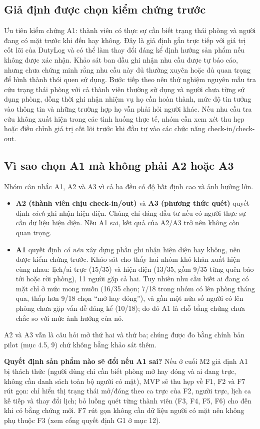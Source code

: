 \subsection{Giả định được chọn kiểm chứng trước}
Ưu tiên kiểm chứng A1: thành viên có thực sự cần biết trạng thái phòng và người đang có mặt trước khi đến hay không. Đây là giả định gắn trực tiếp với giá trị cốt lõi của DutyLog và có thể làm thay đổi đáng kể định hướng sản phẩm nếu không được xác nhận. Khảo sát ban đầu ghi nhận nhu cầu được tự báo cáo, nhưng chưa chứng minh rằng nhu cầu này đủ thường xuyên hoặc đủ quan trọng để hình thành thói quen sử dụng. Bước tiếp theo nên thử nghiệm nguyên mẫu tra cứu trạng thái phòng với cả thành viên thường sử dụng và người chưa từng sử dụng phòng, đồng thời ghi nhận nhiệm vụ họ cần hoàn thành, mức độ tin tưởng vào thông tin và những trường hợp họ vẫn phải hỏi người khác. Nếu nhu cầu tra cứu không xuất hiện trong các tình huống thực tế, nhóm cần xem xét thu hẹp hoặc điều chỉnh giá trị cốt lõi trước khi đầu tư vào các chức năng check-in/check-out.

\subsection{Vì sao chọn A1 mà không phải A2 hoặc A3}
Nhóm cân nhắc A1, A2 và A3 vì cả ba đều có độ bất định cao và ảnh hưởng lớn.
\begin{itemize}[nosep]
\item \textbf{A2 (thành viên chịu check-in/out)} và \textbf{A3 (phương thức quét)} quyết định \emph{cách} ghi nhận hiện diện. Chúng chỉ đáng đầu tư nếu có người thực sự cần dữ liệu hiện diện. Nếu A1 sai, kết quả của A2/A3 trở nên không còn quan trọng.
\item \textbf{A1} quyết định \emph{có nên} xây dựng phần ghi nhận hiện diện hay không, nên được kiểm chứng trước. Khảo sát cho thấy hai nhóm khó khăn xuất hiện cùng nhau: lịch/ai trực (15/35) và hiện diện (13/35, gồm 9/35 từng quên báo tới hoặc rời phòng), 11 người gặp cả hai. Tuy nhiên nhu cầu biết ai đang có mặt chỉ ở mức mong muốn (16/35 chọn; 7/18 trong nhóm có lên phòng tháng qua, thấp hơn 9/18 chọn ``mở hay đóng''), và gần một nửa số người có lên phòng chưa gặp vấn đề đáng kể (10/18); do đó A1 là chỗ bằng chứng chưa chắc so với mức ảnh hưởng của nó.
\end{itemize}
A2 và A3 vẫn là câu hỏi mở thứ hai và thứ ba; chúng được đo bằng chính bản pilot (mục 4.5, 9) chứ không bằng khảo sát thêm.

\textbf{Quyết định sản phẩm nào sẽ đổi nếu A1 sai?} Nếu ở cuối M2 giả định A1 bị thách thức (người dùng chỉ cần biết phòng mở hay đóng và ai đang trực, không cần danh sách toàn bộ người có mặt), MVP sẽ thu hẹp về F1, F2 và F7 rút gọn: chỉ hiển thị trạng thái mở/đóng theo ca trực của F2, người trực, lịch ca kế tiếp và thay đổi lịch; bỏ luồng quét từng thành viên (F3, F4, F5, F6) cho đến khi có bằng chứng mới. F7 rút gọn không cần dữ liệu người có mặt nên không phụ thuộc F3 (xem cổng quyết định G1 ở mục 12).
